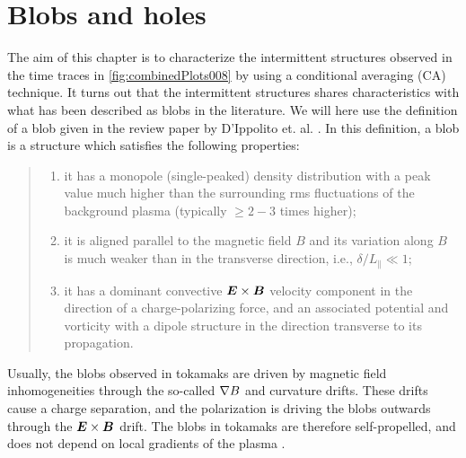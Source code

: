\section{Blobs and holes}
\label{sec:blobsAndHoles}
%
The aim of this chapter is to characterize the intermittent structures observed in the time traces in \cref{fig:combinedPlots008} by using a conditional averaging (CA) technique.
It turns out that the intermittent structures shares characteristics with what has been described as blobs in the literature.
We will here use the definition of a blob given in the review paper by D'Ippolito et. al. \cite{DIppolito2011}.
In this definition, a blob is a structure which satisfies the following properties:
%
\begin{quote}
    \begin{enumerate}[noitemsep]
            \item  it has a monopole (single-peaked) density distribution with a peak value much higher than the surrounding rms fluctuations of the background plasma (typically $\geq 2-3$ times higher);
            \item  it is aligned parallel to the magnetic field $B$ and its variation along $B$ is much weaker than in the transverse direction, i.e., $\delta/L_\|\ll1$;
            \item it has a dominant convective $\boldsymbol{E}\times\boldsymbol{B}$ velocity component in the direction of a charge-polarizing force, and an associated potential and vorticity with a dipole structure in the direction transverse to its propagation.
    \end{enumerate}
\end{quote}
%
Usually, the blobs observed in tokamaks are driven by magnetic field inhomogeneities through the so-called $\nabla B$ and curvature drifts.
These drifts cause a charge separation, and the polarization is driving the blobs outwards through the $\boldsymbol{E}\times\boldsymbol{B}$ drift.
The blobs in tokamaks are therefore self-propelled, and does not depend on local gradients of the plasma \cite{Krasheninnikov2008}.

